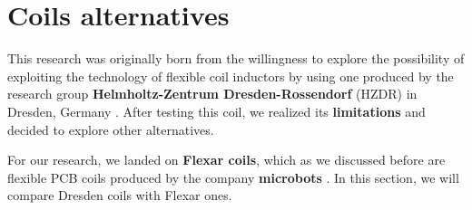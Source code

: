 \section{Coils alternatives}
This research was originally born from the willingness to explore the possibility of exploiting the technology of flexible coil inductors by using one produced by the research group \textbf{Helmholtz-Zentrum Dresden-Rossendorf} (HZDR) in Dresden, Germany \cite{HZDR}.
After testing this coil, we realized its \textbf{limitations} and decided to explore other alternatives.

For our research, we landed on \textbf{Flexar coils}, which as we discussed before are flexible PCB coils produced by the company \textbf{microbots} \cite{microbots}.
In this section, we will compare Dresden coils with Flexar ones.



